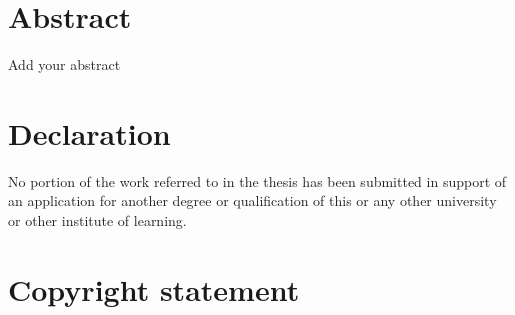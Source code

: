 \begin{justify}

\tableofcontents

\clearpage

\listoffigures

\clearpage

\listoftables


\clearpage
\chapter{\fontsize{24pt}{20pt}\selectfont \textbf{Abstract}}
\thispagestyle{plain}
\vspace{0.1 in}
\noindent

Add your abstract

\clearpage
\thispagestyle{plain}
\chapter{\fontsize{24pt}{20pt}\selectfont \textbf{Declaration}}

\vspace{0.1 in}
\noindent

No portion of the work referred to in the thesis has been submitted in support of an application for another degree or qualification of this or any other university or other institute of learning.

\clearpage
\thispagestyle{plain}
\chapter{\fontsize{24pt}{20pt}\selectfont \textbf{Copyright statement}}

\vspace{0.1 in}
\noindent


\end{justify}

